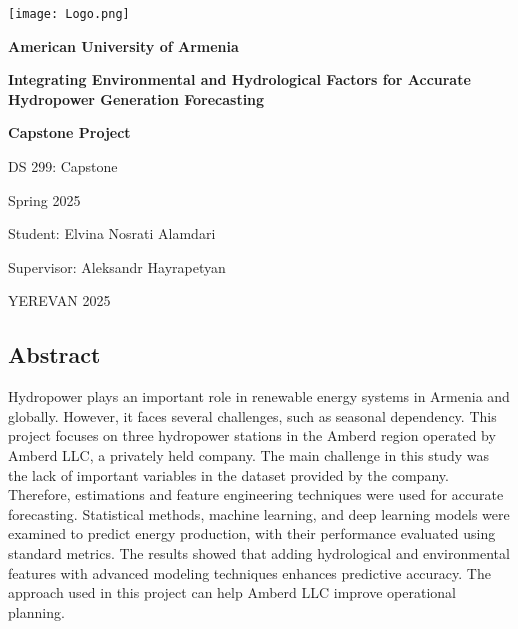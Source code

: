 \documentclass[12pt]{article}
\begin{document}
\thispagestyle{empty}

\begin{center}

    \texttt{[image: Logo.png]}

    \vspace{2.5cm}

    \textbf{\LARGE American University of Armenia}

    \vspace{1cm}

    \textbf{\Large Integrating Environmental and Hydrological Factors for Accurate Hydropower Generation Forecasting}

    \vspace{1cm}

    \textbf{\large Capstone Project}

    \vspace{1cm}

    DS 299: Capstone

    Spring 2025

    Student: Elvina Nosrati Alamdari

    Supervisor: Aleksandr Hayrapetyan

    \vspace{5cm}

    YEREVAN 2025
\end{center}

\clearpage
{}
\newpage

\newpage
\thispagestyle{plain}  

\vspace*{0.2\textheight}  

\begin{center}
\section*{Abstract}
\end{center}

\noindent
    
Hydropower plays an important role in renewable energy systems in Armenia and globally. However, it faces several challenges, such as seasonal dependency. This project focuses on three hydropower stations in the Amberd region operated by Amberd LLC, a privately held company. The main challenge in this study was the lack of important variables in the dataset provided by the company. Therefore, estimations and feature engineering techniques were used for accurate forecasting. Statistical methods, machine learning, and deep learning models were examined to predict energy production, with their performance evaluated using standard metrics. The results showed that adding hydrological and environmental features with advanced modeling techniques enhances predictive accuracy. The approach used in this project can help Amberd LLC improve operational planning.
\end{document}
